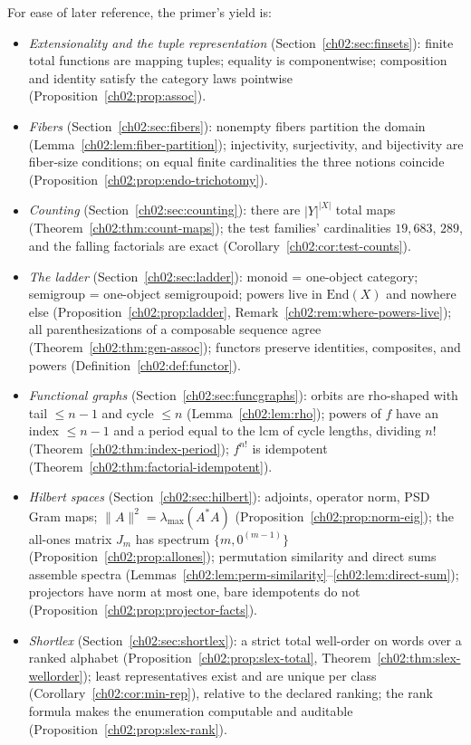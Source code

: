 For ease of later reference, the primer's yield is:

\begin{itemize}
\item \emph{Extensionality and the tuple representation}
(Section~\ref{ch02:sec:finsets}): finite total functions are mapping
tuples; equality is componentwise; composition and identity satisfy the
category laws pointwise (Proposition~\ref{ch02:prop:assoc}).
\item \emph{Fibers} (Section~\ref{ch02:sec:fibers}): nonempty fibers
partition the domain (Lemma~\ref{ch02:lem:fiber-partition}); injectivity,
surjectivity, and bijectivity are fiber-size conditions; on equal finite
cardinalities the three notions coincide
(Proposition~\ref{ch02:prop:endo-trichotomy}).
\item \emph{Counting} (Section~\ref{ch02:sec:counting}): there are
$|Y|^{|X|}$ total maps (Theorem~\ref{ch02:thm:count-maps}); the test
families' cardinalities $19{,}683$, $289$, and the falling factorials are
exact (Corollary~\ref{ch02:cor:test-counts}).
\item \emph{The ladder} (Section~\ref{ch02:sec:ladder}): monoid = one-object
category; semigroup = one-object semigroupoid; powers live in
$\mathrm{End}(X)$ and nowhere else
(Proposition~\ref{ch02:prop:ladder}, Remark~\ref{ch02:rem:where-powers-live});
all parenthesizations of a composable sequence agree
(Theorem~\ref{ch02:thm:gen-assoc}); functors preserve identities,
composites, and powers (Definition~\ref{ch02:def:functor}).
\item \emph{Functional graphs} (Section~\ref{ch02:sec:funcgraphs}): orbits
are rho-shaped with tail $\leq n - 1$ and cycle $\leq n$
(Lemma~\ref{ch02:lem:rho}); powers of $f$ have an index $\leq n - 1$ and a
period equal to the lcm of cycle lengths, dividing $n!$
(Theorem~\ref{ch02:thm:index-period}); $f^{n!}$ is idempotent
(Theorem~\ref{ch02:thm:factorial-idempotent}).
\item \emph{Hilbert spaces} (Section~\ref{ch02:sec:hilbert}): adjoints,
operator norm, PSD Gram maps; $\lVert A \rVert^{2} =
\lambda_{\max}(A^{*}A)$ (Proposition~\ref{ch02:prop:norm-eig}); the
all-ones matrix $J_m$ has spectrum $\{ m, 0^{(m-1)} \}$
(Proposition~\ref{ch02:prop:allones}); permutation similarity and direct
sums assemble spectra
(Lemmas~\ref{ch02:lem:perm-similarity}--\ref{ch02:lem:direct-sum});
projectors have norm at most one, bare idempotents do not
(Proposition~\ref{ch02:prop:projector-facts}).
\item \emph{Shortlex} (Section~\ref{ch02:sec:shortlex}): a strict total
well-order on words over a ranked alphabet
(Proposition~\ref{ch02:prop:slex-total},
Theorem~\ref{ch02:thm:slex-wellorder}); least representatives exist and
are unique per class (Corollary~\ref{ch02:cor:min-rep}), relative to the
declared ranking; the rank formula makes the enumeration computable and
auditable (Proposition~\ref{ch02:prop:slex-rank}).
\end{itemize}

